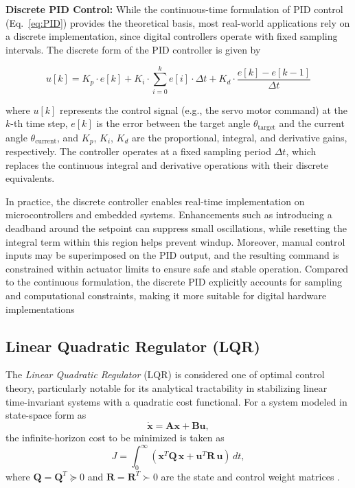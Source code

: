 \documentclass[english, bachelor, utf8]{base/thesis_telematics}
\begin{document}
\textbf{Discrete PID Control:}  
While the continuous-time formulation of PID control (Eq.~\ref{eq:PID}) provides the theoretical basis, most real-world applications rely on a discrete implementation, since digital controllers operate with fixed sampling intervals. The discrete form of the PID controller is given by

\begin{equation}
u[k] = K_p \cdot e[k] + K_i \cdot \sum_{i=0}^{k} e[i] \cdot \Delta t + K_d \cdot \frac{e[k] - e[k-1]}{\Delta t}
\label{eq:pid_control}
\end{equation}

where $u[k]$ represents the control signal (e.g., the servo motor command) at the $k$-th time step, $e[k]$ is the error between the target angle $\theta_{\text{target}}$ and the current angle $\theta_{\text{current}}$, and $K_p$, $K_i$, $K_d$ are the proportional, integral, and derivative gains, respectively. The controller operates at a fixed sampling period $\Delta t$, which replaces the continuous integral and derivative operations with their discrete equivalents.

In practice, the discrete controller enables real-time implementation on microcontrollers and embedded systems. Enhancements such as introducing a deadband around the setpoint can suppress small oscillations, while resetting the integral term within this region helps prevent windup. Moreover, manual control inputs may be superimposed on the PID output, and the resulting command is constrained within actuator limits to ensure safe and stable operation. Compared to the continuous formulation, the discrete PID explicitly accounts for sampling and computational constraints, making it more suitable for digital hardware implementations

\subsection{Linear Quadratic Regulator (LQR)}

The \textit{Linear Quadratic Regulator} (LQR) is considered one of optimal control theory, particularly notable for its analytical tractability in stabilizing linear time-invariant systems with a quadratic cost functional. For a system modeled in state-space form as
\[
\dot{\mathbf{x}} = \mathbf{A} \mathbf{x} + \mathbf{B} \mathbf{u},
\]
the infinite-horizon cost to be minimized is taken as
\[
J = \int_{0}^{\infty} \left( \mathbf{x}^{T} \mathbf{Q} \, \mathbf{x} + \mathbf{u}^{T} \mathbf{R} \, \mathbf{u} \right) \, dt,
\]
where \(\mathbf{Q} = \mathbf{Q}^{T} \succeq 0\) and \(\mathbf{R} = \mathbf{R}^{T} \succ 0\) are the state and control weight matrices \cite{underactuatedLQR}.
\end{document}
